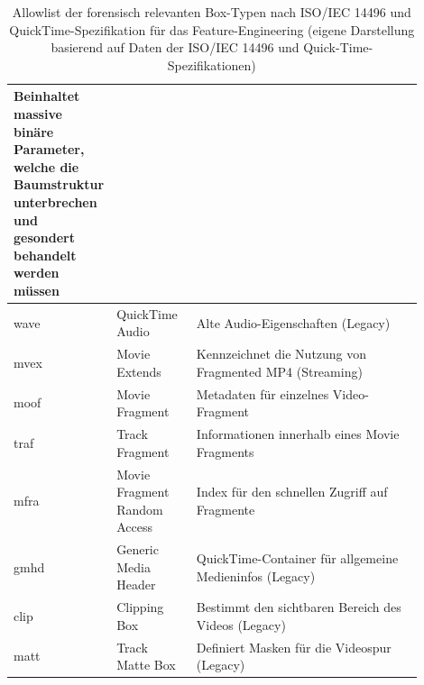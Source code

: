 \begin{table}
\begin{tabular}{>{\raggedright\arraybackslash}p{0.05\linewidth}>{\raggedright\arraybackslash}p{0.2\linewidth}>{\raggedright\arraybackslash}p{0.65\linewidth}}
Beinhaltet massive binäre Parameter, welche die Baumstruktur unterbrechen und gesondert behandelt werden müssen\\\midrule
 wave& QuickTime Audio&Alte Audio-Eigenschaften (Legacy)\\\midrule
 mvex& Movie Extends&Kennzeichnet die Nutzung von Fragmented MP4 (Streaming)\\\midrule
 moof& Movie Fragment&Metadaten für einzelnes Video-Fragment\\\midrule
 traf& Track Fragment&Informationen innerhalb eines Movie Fragments\\\midrule
 mfra& Movie Fragment Random Access&Index für den schnellen Zugriff auf Fragmente\\\midrule
 gmhd& Generic Media Header&QuickTime-Container für allgemeine Medieninfos (Legacy)\\\midrule
 clip& Clipping Box&Bestimmt den sichtbaren Bereich des Videos (Legacy)\\\midrule
 matt& Track Matte Box&Definiert Masken für die Videospur (Legacy)\\ \bottomrule
    \end{tabular}
\caption{Allowlist der forensisch relevanten Box-Typen nach ISO/IEC 14496 und QuickTime-Spezifikation für das Feature-Engineering (eigene Darstellung basierend auf Daten der ISO/IEC 14496\cite{iso_14496-12_2022}\cite{iso_14496-14_2020}\cite{iso_14496-15_2024} und Quick-Time-Spezifikationen\cite{apple_quicktime_2001})}
\label{tab:mp4allowlisting}
\end{table}